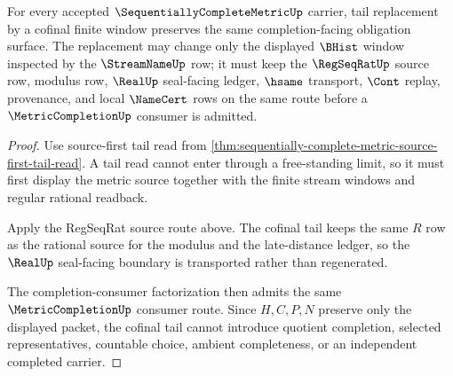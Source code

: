 \begin{theorem}
\label{thm:sequentially-complete-metric-tail-cofinality}
For every accepted $\SequentiallyCompleteMetricUp$ carrier, tail replacement by a cofinal finite window preserves the same completion-facing obligation surface. The replacement may change only the displayed $\BHist$ window inspected by the $\StreamNameUp$ row; it must keep the $\RegSeqRatUp$ source row, modulus row, $\RealUp$ seal-facing ledger, $\hsame$ transport, $\Cont$ replay, provenance, and local $\NameCert$ rows on the same route before a $\MetricCompletionUp$ consumer is admitted.
\end{theorem}
\begin{proof}
Use source-first tail read from \autoref{thm:sequentially-complete-metric-source-first-tail-read}. A tail read cannot enter through a free-standing limit, so it must first display the metric source together with the finite stream windows and regular rational readback.

Apply the RegSeqRat source route above. The cofinal tail keeps the same $R$ row as the rational source for the modulus and the late-distance ledger, so the $\RealUp$ seal-facing boundary is transported rather than regenerated.

The completion-consumer factorization then admits the same $\MetricCompletionUp$ consumer route. Since $H,C,P,N$ preserve only the displayed packet, the cofinal tail cannot introduce quotient completion, selected representatives, countable choice, ambient completeness, or an independent completed carrier.
\end{proof}

